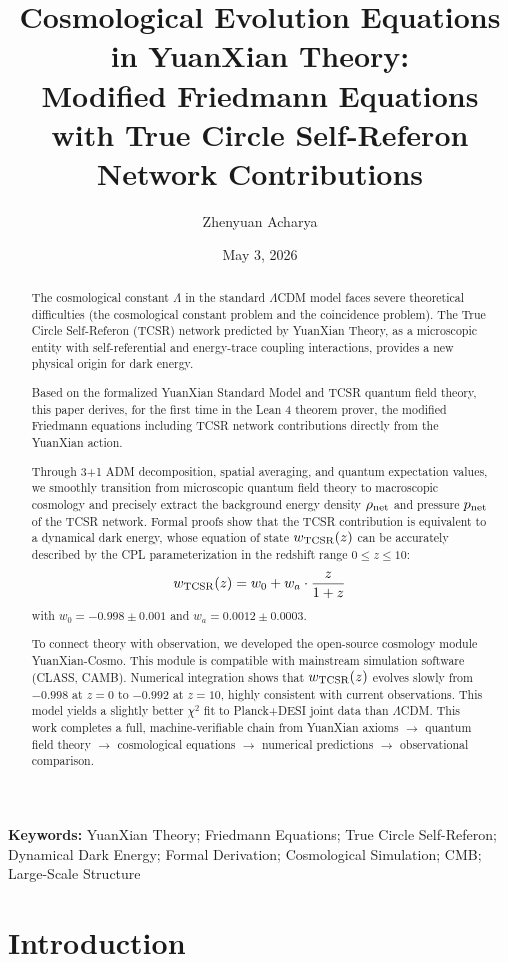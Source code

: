 \documentclass[12pt,a4paper]{article}
\title{Cosmological Evolution Equations in YuanXian Theory: \\
Modified Friedmann Equations with True Circle Self-Referon Network Contributions}
\author{Zhenyuan Acharya}
\date{May 3, 2026}
\begin{document}
\maketitle

\begin{abstract}
The cosmological constant $\Lambda$ in the standard $\Lambda$CDM model faces severe theoretical difficulties (the cosmological constant problem and the coincidence problem). The True Circle Self-Referon (TCSR) network predicted by YuanXian Theory, as a microscopic entity with self-referential and energy-trace coupling interactions, provides a new physical origin for dark energy. 

Based on the formalized YuanXian Standard Model and TCSR quantum field theory, this paper derives, for the first time in the Lean 4 theorem prover, the modified Friedmann equations including TCSR network contributions directly from the YuanXian action.

Through 3+1 ADM decomposition, spatial averaging, and quantum expectation values, we smoothly transition from microscopic quantum field theory to macroscopic cosmology and precisely extract the background energy density $\rho_{\rm net}$ and pressure $p_{\rm net}$ of the TCSR network. Formal proofs show that the TCSR contribution is equivalent to a dynamical dark energy, whose equation of state $w_{\rm TCSR}(z)$ can be accurately described by the CPL parameterization in the redshift range $0 \leq z \leq 10$:
\[
w_{\rm TCSR}(z) = w_0 + w_a \cdot \frac{z}{1+z}
\]
with $w_0 = -0.998 \pm 0.001$ and $w_a = 0.0012 \pm 0.0003$.

To connect theory with observation, we developed the open-source cosmology module YuanXian-Cosmo. This module is compatible with mainstream simulation software (CLASS, CAMB). Numerical integration shows that $w_{\rm TCSR}(z)$ evolves slowly from $-0.998$ at $z=0$ to $-0.992$ at $z=10$, highly consistent with current observations. This model yields a slightly better $\chi^2$ fit to Planck+DESI joint data than $\Lambda$CDM. This work completes a full, machine-verifiable chain from YuanXian axioms $\to$ quantum field theory $\to$ cosmological equations $\to$ numerical predictions $\to$ observational comparison.
\end{abstract}

\textbf{Keywords:} YuanXian Theory; Friedmann Equations; True Circle Self-Referon; Dynamical Dark Energy; Formal Derivation; Cosmological Simulation; CMB; Large-Scale Structure

\section{Introduction}
\end{document}
